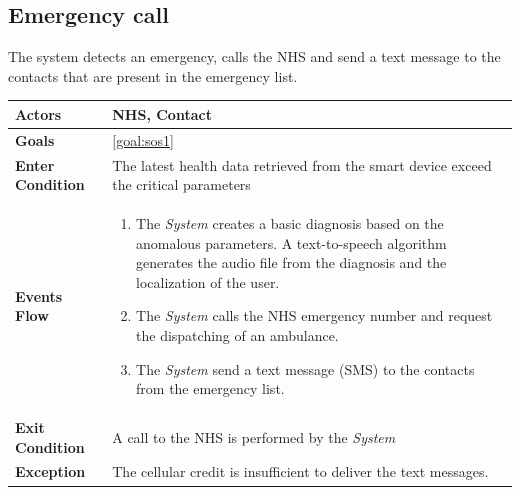   \subsection{Emergency call}
The system detects an emergency, calls the NHS and send a text message to the contacts that are present in the emergency list.

\begin{table}[H]
	\centering
    
    \begin{tabular}{|p{3.5cm}|p{10.3cm}|}
    
    \hline
    \textbf{\large{Actors}}  			& NHS, Contact						     \\
    				 					
    \hline
    \textbf{\large{Goals}} 				& \ref{goal:sos1}                \\
    
    \hline
    \textbf{\large{Enter Condition}}	& The latest health data retrieved from the smart device exceed the critical parameters		\\
    
    \hline
    \textbf{\large{Events Flow}}		& \begin{enumerate}[leftmargin=0.5cm]
                                          	\item The \emph{System} creates a basic diagnosis based on the anomalous parameters. A text-to-speech algorithm generates the audio file from the diagnosis and the localization of the user.
                                            \item The \emph{System} calls the NHS emergency number and request the dispatching of an ambulance.
                                            \item The \emph{System} send a text message (SMS) to the contacts from the emergency list.
                                      \end{enumerate}
    										\\
    \hline
    \textbf{\large{Exit Condition}} 	& A call to the NHS is performed by the \emph{System} \\
    
    \hline
    \textbf{\large{Exception}} 			& The cellular credit is insufficient to deliver the text messages.\\
    								
    
    \hline
    
    
    \end{tabular}
	
\end{table}
